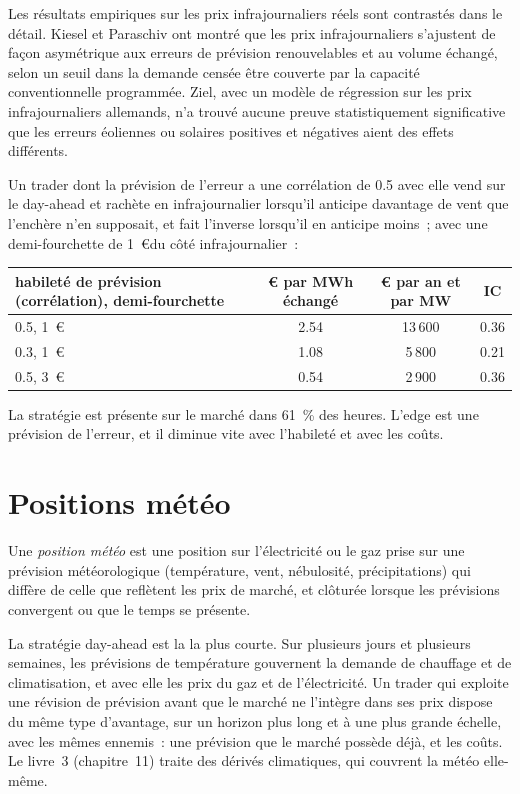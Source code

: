 Les résultats empiriques sur les prix infrajournaliers réels sont contrastés dans le détail. Kiesel et Paraschiv ont montré que les prix infrajournaliers s'ajustent de façon asymétrique aux erreurs de prévision renouvelables
et au volume échangé, selon un seuil dans la demande censée être couverte par la capacité conventionnelle programmée. Ziel, avec un
modèle de régression sur les prix infrajournaliers allemands, n'a trouvé aucune preuve statistiquement significative que les erreurs éoliennes ou solaires positives et négatives aient
des effets différents.

Un trader dont la prévision de l'erreur a une corrélation de 0.5 avec elle vend sur le day-ahead et rachète en infrajournalier lorsqu'il anticipe davantage de vent que
l'enchère n'en supposait, et fait l'inverse lorsqu'il en anticipe moins~; avec une demi-fourchette de 1~\euro du côté infrajournalier~:

\begin{center}
\small
\begin{tabular}{@{}lccc@{}}
\toprule
habileté de prévision (corrélation), demi-fourchette & \euro{} par MWh échangé & \euro{} par an et par MW & IC\\
\midrule
0.5, 1~\euro & 2.54 & 13\,600 & 0.36\\
0.3, 1~\euro & 1.08 & 5\,800 & 0.21\\
0.5, 3~\euro & 0.54 & 2\,900 & 0.36\\
\bottomrule
\end{tabular}
\end{center}

La stratégie est présente sur le marché dans 61~\% des heures. L'edge est une prévision de l'erreur, et il diminue vite avec l'habileté et avec les coûts.

\section{Positions météo}

\begin{definition}\label{def:s2:power-and-gas-trading:weather}
Une \emph{position météo} est une position sur l'électricité ou le gaz prise sur une prévision météorologique (température, vent,
nébulosité, précipitations) qui diffère de celle que reflètent les prix de marché, et clôturée lorsque les prévisions convergent ou que le temps se présente.
\end{definition}

La stratégie day-ahead est la  la plus courte. Sur plusieurs jours et plusieurs semaines, les prévisions de température gouvernent la demande de chauffage et de climatisation, et avec
elle les prix du gaz et de l'électricité. Un trader qui exploite une révision de prévision avant que le marché ne l'intègre dans ses prix dispose du même type d'avantage, sur un horizon plus long et à
une plus grande échelle, avec les mêmes ennemis~: une prévision que le marché possède déjà, et les coûts. Le livre~3 (chapitre~11) traite des dérivés climatiques, qui
couvrent la météo elle-même.

